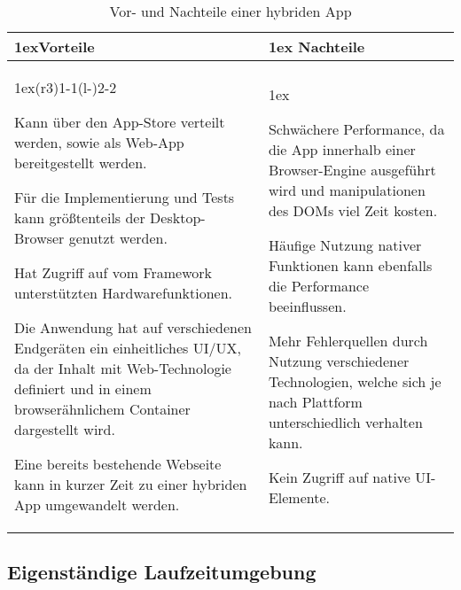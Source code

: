 \begin{table}[!h]
	\begin{tabularx}{\linewidth}{>{\parskip1ex}X@{\kern4\tabcolsep}>{\parskip1ex}X}
		\toprule
		\hfil\bfseries Vorteile
		&
		\hfil\bfseries Nachteile
		\\\cmidrule(r{3\tabcolsep}){1-1}\cmidrule(l{-\tabcolsep}){2-2}
		
		Kann über den App-Store verteilt werden, sowie als Web-App bereitgestellt werden.\par
		Für die Implementierung und Tests kann größtenteils der Desktop-Browser genutzt werden.\par
		Hat Zugriff auf vom Framework unterstützten Hardwarefunktionen.\par
		Die Anwendung hat auf verschiedenen Endgeräten ein einheitliches \ac{UI}/\ac{UX}, da der Inhalt mit Web-Technologie definiert und in einem browserähnlichem Container dargestellt wird.\par
		Eine bereits bestehende Webseite kann in kurzer Zeit zu einer hybriden App umgewandelt werden.\par
		
		&
		
		Schwächere Performance, da die App innerhalb einer Browser-Engine ausgeführt wird und manipulationen des \ac{DOM}s viel Zeit kosten.\par
		Häufige Nutzung nativer Funktionen kann ebenfalls die Performance beeinflussen.\par
		Mehr Fehlerquellen durch Nutzung verschiedener Technologien, welche sich je nach Plattform unterschiedlich verhalten kann.\par
		Kein Zugriff auf native \ac{UI}-Elemente.\par
		\\\bottomrule
	\end{tabularx}
	\caption{Vor- und Nachteile einer hybriden App}
\end{table}

\clearpage %
\subsection{Eigenständige Laufzeitumgebung}

